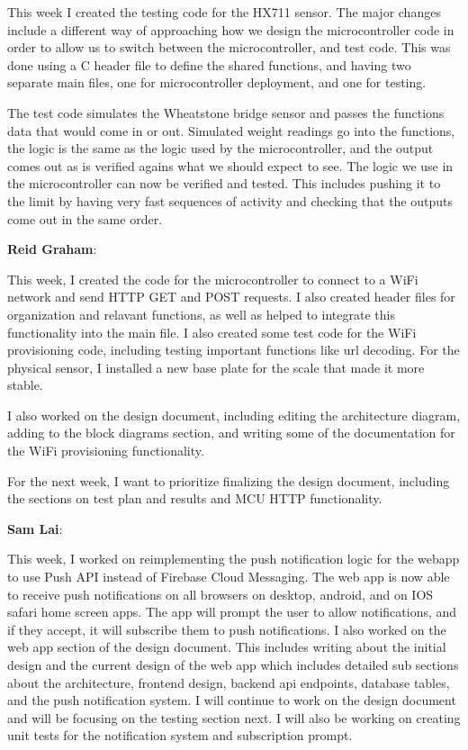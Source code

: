 \documentclass[12pt]{article}
\begin{document}
This week I created the testing code for the HX711 sensor. The major changes include a different way of approaching how we design the microcontroller code in order to allow us to switch between the microcontroller, and test code. This was done using a C header file to define the shared functions, and having two separate main files, one for microcontroller deployment, and one for testing. 

The test code simulates the Wheatstone bridge sensor and passes the functions data that would come in or out. Simulated weight readings go into the functions, the logic is the same as the logic used by the microcontroller, and the output comes out as is verified agains what we should expect to see. The logic we use in the microcontroller can now be verified and tested. This includes pushing it to the limit by having very fast sequences of activity and checking that the outputs come out in the same order. 

\noindent\textbf{Reid Graham}:

This week, I created the code for the microcontroller to connect to a WiFi network and send HTTP GET and POST requests. I also created header files for organization and relavant functions, as well as helped to integrate this functionality into the main file. I also created some test code for the WiFi provisioning code, including testing important functions like url decoding. For the physical sensor, I installed a new base plate for the scale that made it more stable.

I also worked on the design document, including editing the architecture diagram, adding to the block diagrams section, and writing some of the documentation for the WiFi provisioning functionality.

For the next week, I want to prioritize finalizing the design document, including the sections on test plan and results and MCU HTTP functionality.



\noindent\textbf{Sam Lai}:

This week, I worked on reimplementing the push notification logic for the webapp to use Push API instead of Firebase Cloud Messaging. 
The web app is now able to receive push notifications on all browsers on desktop, android, and on IOS safari home screen apps. The app
will prompt the user to allow notifications, and if they accept, it will subscribe them to push notifications. I also worked on the web 
app section of the design document. This includes writing about the initial design and the current design of the web app which includes 
detailed sub sections about the architecture, frontend design, backend api endpoints, database tables, and the push notification system. 
I will continue to work on the design document and will be focusing on the testing section next. I will also be working on creating unit 
tests for the notification system and subscription prompt.
\end{document}
